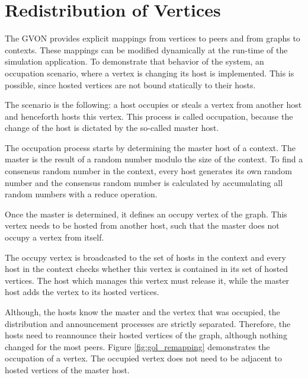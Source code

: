 \section{Redistribution of Vertices}

The GVON provides explicit mappings from vertices to peers and from
graphs to contexts. These mappings can be modified dynamically at the
run-time of the simulation application.  To demonstrate that behavior
of the system, an occupation scenario, where a vertex is changing its
host is implemented. This is possible, since hosted vertices are not
bound statically to their hosts.

The scenario is the following: a host occupies or steals a vertex
from another host and henceforth hosts this vertex.  This process
is called occupation, because the change of the host is
dictated by the so-called master host.

The occupation process starts by determining the master host of a
context. The master is the result of a random number modulo the size
of the context. To find a consensus random number in the context,
every host generates its own random number and the consensus random
number is calculated by accumulating all random numbers with a
reduce operation.

Once the master is determined, it defines an occupy vertex of the
graph. This vertex needs to be hosted from another host, such that the
master does not occupy a vertex from itself.

The occupy vertex is broadcasted to the set of hosts in the context
and every host in the context checks whether this vertex is contained
in its set of hosted vertices. The host which manages this vertex must
release it, while the master host adds the vertex to its hosted
vertices.

Although, the hosts know the master and the vertex that was occupied,
the distribution and announcement processes are strictly
separated. Therefore, the hosts need to reannounce their hosted
vertices of the graph, although nothing changed for the most peers.
Figure \ref{fig:gol_remapping} demonstrates the occupation of a
vertex.  The occupied vertex does not need to be adjacent to hosted
vertices of the master host.

